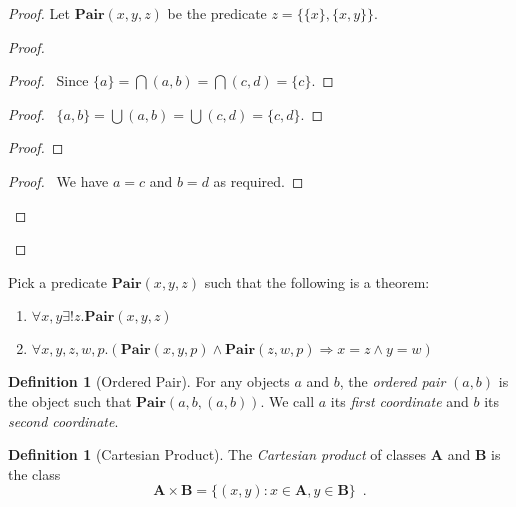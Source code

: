 \documentclass{report}
\let\qed\relax
\theoremstyle{definition}
\newtheorem{definition}[axiom]{Definition}
\begin{document}
    \begin{proof}
        Let $\mathbf{Pair}(x,y,z)$ be the predicate $z = \{ \{ x \}, \{ x , y \} \}$.
        \pf
        \begin{proof}
            \begin{proof}
                \pf\ Since $\{a\} = \bigcap (a,b) = \bigcap (c,d) = \{c\}$.
            \end{proof}
            \begin{proof}
                \pf\ $\{a,b\} = \bigcup (a,b) = \bigcup (c,d) = \{c,d\}$.
            \end{proof}
            \begin{proof}
            \end{proof}
            \begin{proof}
                \pf\ We have $a = c$ and $b = d$ as required.
            \end{proof}
        \end{proof}
        \qed
    \end{proof}

    Pick a predicate $\mathbf{Pair}(x,y,z)$ such that the following is a theorem:
    \begin{enumerate}
        \item $\forall x,y \exists ! z. \mathbf{Pair}(x,y,z)$
        \item $\forall x,y,z,w,p. (\mathbf{Pair}(x,y,p) \wedge \mathbf{Pair}(z,w,p) \Rightarrow x = z \wedge y = w)$
    \end{enumerate}

    \begin{definition}[Ordered Pair]
        For any objects $a$ and $b$, the \emph{ordered pair} $(a,b)$ is the object such
        that $\mathbf{Pair}(a,b,(a,b))$.
        We call $a$ its \emph{first coordinate} and $b$ its \emph{second coordinate}.
    \end{definition}

    \begin{definition}[Cartesian Product]
        The \emph{Cartesian product} of classes $\mathbf{A}$ and $\mathbf{B}$ is the class
        \[ \mathbf{A} \times \mathbf{B} = \{ (x,y) : x \in \mathbf{A}, y \in \mathbf{B} \} \enspace . \]
    \end{definition}
\end{document}
